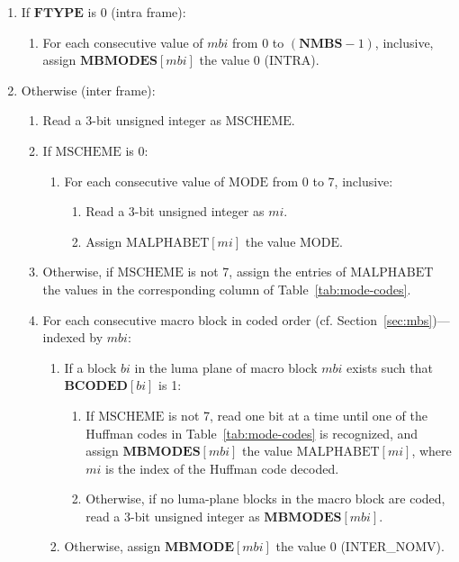 \documentclass[9pt,letterpaper]{book}
\newcommand{\idx}[1]{{\ensuremath{\mathit{#1}}}}
\newcommand{\bi}{\idx{bi}}
\newcommand{\mbi}{\idx{mbi}}
\newcommand{\mi}{\idx{mi}}
\newcommand{\bitvar}[1]{\ensuremath{\mathbf{\bm{#1}}}}
\newcommand{\locvar}[1]{\ensuremath{\mathrm{#1}}}
\numberwithin{equation}{chapter}
\numberwithin{figure}{chapter}
\numberwithin{table}{chapter}
\begin{document}
\begin{enumerate}
\item
If \bitvar{FTYPE} is 0 (intra frame):
\begin{enumerate}
\item
For each consecutive value of \locvar{\mbi} from 0 to $(\bitvar{NMBS}-1)$,
 inclusive, assign $\bitvar{MBMODES}[\mbi]$ the value 0 (INTRA).
\end{enumerate}
\item
Otherwise (inter frame):
\begin{enumerate}
\item
Read a 3-bit unsigned integer as \locvar{MSCHEME}.
\item
If \locvar{MSCHEME} is 0:
\begin{enumerate}
\item
For each consecutive value of \locvar{MODE} from 0 to 7, inclusive:
\begin{enumerate}
\item
Read a 3-bit unsigned integer as \locvar{\mi}.
\item
Assign $\locvar{MALPHABET}[\mi]$ the value \locvar{MODE}.
\end{enumerate}
\end{enumerate}
\item
Otherwise, if \locvar{MSCHEME} is not 7, assign the entries of
 \locvar{MALPHABET} the values in the corresponding column of
 Table~\ref{tab:mode-codes}.
\item
For each consecutive macro block in coded order (cf.
 Section~\ref{sec:mbs})---indexed by \locvar{\mbi}:
\begin{enumerate}
\item
If a block \locvar{\bi} in the luma plane of macro block \locvar{\mbi} exists
 such that $\bitvar{BCODED}[\locvar{\bi}]$ is 1:
\begin{enumerate}
\item
If \locvar{MSCHEME} is not 7, read one bit at a time until one of the Huffman
 codes in Table~\ref{tab:mode-codes} is recognized, and assign
 $\bitvar{MBMODES}[\locvar{\mbi}]$ the value
 $\locvar{MALPHABET}[\locvar{\mi}]$, where \locvar{\mi} is the index of the
 Huffman code decoded.
\item
Otherwise, if no luma-plane blocks in the macro block are coded, read a 3-bit
 unsigned integer as $\bitvar{MBMODES}[\locvar{\mbi}]$.
\end{enumerate}
\item
Otherwise, assign $\bitvar{MBMODE}[\locvar{\mbi}]$ the value 0 (INTER\_NOMV).
\end{enumerate}
\end{enumerate}
\end{enumerate}
\end{document}
